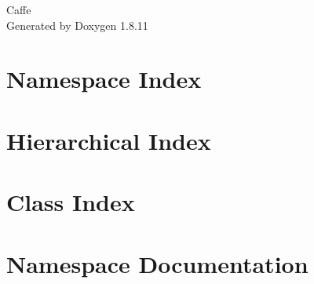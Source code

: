 \documentclass[twoside]{book}
\newcommand{\+}{\discretionary{\mbox{\scriptsize$\hookleftarrow$}}{}{}}
\newcommand{\clearemptydoublepage}{%
  \newpage{\pagestyle{empty}\cleardoublepage}%
}
\begin{document}
\hypersetup{pageanchor=false,
             bookmarksnumbered=true,
             pdfencoding=unicode
            }
\begin{titlepage}
\vspace*{7cm}
\begin{center}%
{\Large Caffe }\\
\vspace*{1cm}
{\large Generated by Doxygen 1.8.11}\\
\end{center}
\end{titlepage}
\clearemptydoublepage
\tableofcontents
\clearemptydoublepage
{}
\hypersetup{pageanchor=true}

\chapter{Namespace Index}

\chapter{Hierarchical Index}

\chapter{Class Index}

\chapter{Namespace Documentation}



\end{document}
